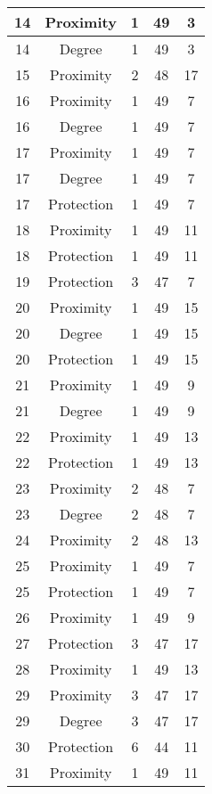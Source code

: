 \documentclass[results.tex]{subfiles}
\begin{document}
\begin{center}
\begin{tabular}{| c || c | c | c | c |}
    \hline
    14 & Proximity & 1 & 49 & 3 \\ 
    \hline
    14 & Degree & 1 & 49 & 3 \\ 
    \hline
    15 & Proximity & 2 & 48 & 17 \\ 
    \hline
    16 & Proximity & 1 & 49 & 7 \\ 
    \hline
    16 & Degree & 1 & 49 & 7 \\ 
    \hline
    17 & Proximity & 1 & 49 & 7 \\ 
    \hline
    17 & Degree & 1 & 49 & 7 \\ 
    \hline
    17 & Protection & 1 & 49 & 7 \\ 
    \hline
    18 & Proximity & 1 & 49 & 11 \\ 
    \hline
    18 & Protection & 1 & 49 & 11 \\ 
    \hline
    19 & Protection & 3 & 47 & 7 \\ 
    \hline
    20 & Proximity & 1 & 49 & 15 \\ 
    \hline
    20 & Degree & 1 & 49 & 15 \\ 
    \hline
    20 & Protection & 1 & 49 & 15 \\ 
    \hline
    21 & Proximity & 1 & 49 & 9 \\ 
    \hline
    21 & Degree & 1 & 49 & 9 \\ 
    \hline
    22 & Proximity & 1 & 49 & 13 \\ 
    \hline
    22 & Protection & 1 & 49 & 13 \\ 
    \hline
    23 & Proximity & 2 & 48 & 7 \\ 
    \hline
    23 & Degree & 2 & 48 & 7 \\ 
    \hline
    24 & Proximity & 2 & 48 & 13 \\ 
    \hline
    25 & Proximity & 1 & 49 & 7 \\ 
    \hline
    25 & Protection & 1 & 49 & 7 \\ 
    \hline
    26 & Proximity & 1 & 49 & 9 \\ 
    \hline
    27 & Protection & 3 & 47 & 17 \\ 
    \hline
    28 & Proximity & 1 & 49 & 13 \\ 
    \hline
    29 & Proximity & 3 & 47 & 17 \\ 
    \hline
    29 & Degree & 3 & 47 & 17 \\ 
    \hline
    30 & Protection & 6 & 44 & 11 \\ 
    \hline
    31 & Proximity & 1 & 49 & 11 \\ 

\end{tabular}
\end{center}
\end{document}
